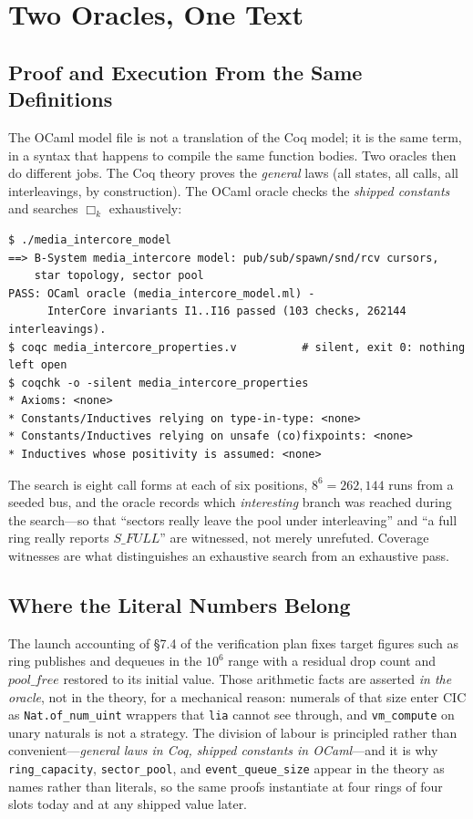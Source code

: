 \documentclass[10pt,journal,compsoc,twocolumn]{article}
\theoremstyle{definition}
\theoremstyle{remark}
\theoremstyle{plain}
\newcommand{\CIC}{\textsc{CIC}}
\newcommand{\ctr}[1]{\texttt{#1}}
\begin{document}
\section{Two Oracles, One Text}
\label{sec:oracles}

\subsection{Proof and Execution From the Same Definitions}
The OCaml model file is not a translation of the Coq model; it is the same term, in a syntax that happens to compile the same function bodies. Two oracles then do different jobs. The Coq theory proves the \emph{general} laws (all states, all calls, all interleavings, by construction). The OCaml oracle checks the \emph{shipped constants} and searches \(\Box_k\) exhaustively:

\begin{lstlisting}[basicstyle=\ttfamily\scriptsize]
$ ./media_intercore_model
==> B-System media_intercore model: pub/sub/spawn/snd/rcv cursors,
    star topology, sector pool
PASS: OCaml oracle (media_intercore_model.ml) -
      InterCore invariants I1..I16 passed (103 checks, 262144 interleavings).
$ coqc media_intercore_properties.v          # silent, exit 0: nothing left open
$ coqchk -o -silent media_intercore_properties
* Axioms: <none>
* Constants/Inductives relying on type-in-type: <none>
* Constants/Inductives relying on unsafe (co)fixpoints: <none>
* Inductives whose positivity is assumed: <none>
\end{lstlisting}

The search is eight call forms at each of six positions, \(8^{6} = 262{,}144\) runs from a seeded bus, and the oracle records which \emph{interesting} branch was reached during the search---so that ``sectors really leave the pool under interleaving'' and ``a full ring really reports \(\mathit{S\_FULL}\)'' are witnessed, not merely unrefuted. Coverage witnesses are what distinguishes an exhaustive search from an exhaustive pass.

\subsection{Where the Literal Numbers Belong}
The launch accounting of \S7.4 of the verification plan fixes target figures such as ring publishes and dequeues in the \(10^{6}\) range with a residual drop count and \(\mathit{pool\_free}\) restored to its initial value. Those arithmetic facts are asserted \emph{in the oracle}, not in the theory, for a mechanical reason: numerals of that size enter \CIC{} as \ctr{Nat.of\_num\_uint} wrappers that \ctr{lia} cannot see through, and \ctr{vm\_compute} on unary naturals is not a strategy. The division of labour is principled rather than convenient---\emph{general laws in Coq, shipped constants in OCaml}---and it is why \ctr{ring\_capacity}, \ctr{sector\_pool}, and \ctr{event\_queue\_size} appear in the theory as names rather than literals, so the same proofs instantiate at four rings of four slots today and at any shipped value later.
\end{document}
